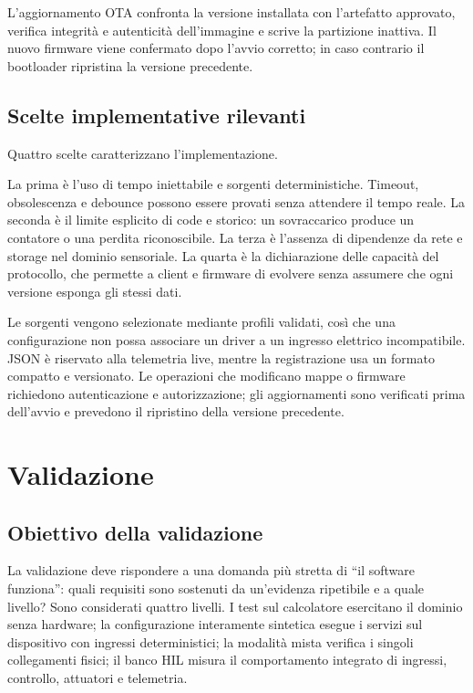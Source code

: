 \documentclass{article}
\begin{document}
L'aggiornamento OTA confronta la versione installata con l'artefatto approvato,
verifica integrità e autenticità dell'immagine e scrive la partizione inattiva.
Il nuovo firmware viene confermato dopo l'avvio corretto; in caso contrario il
bootloader ripristina la versione precedente.

\subsection{Scelte implementative rilevanti}

Quattro scelte caratterizzano l'implementazione.

La prima è l'uso di tempo iniettabile e sorgenti deterministiche. Timeout,
obsolescenza e debounce possono essere provati senza attendere il tempo reale.
La seconda è il limite esplicito di code e storico: un sovraccarico produce un
contatore o una perdita riconoscibile. La terza è l'assenza di dipendenze da
rete e storage nel dominio sensoriale. La quarta è la dichiarazione delle
capacità del protocollo, che permette a client e firmware di evolvere senza
assumere che ogni versione esponga gli stessi dati.

Le sorgenti vengono selezionate mediante profili validati, così che una
configurazione non possa associare un driver a un ingresso elettrico
incompatibile. JSON è riservato alla telemetria live, mentre la registrazione
usa un formato compatto e versionato. Le operazioni che modificano mappe o
firmware richiedono autenticazione e autorizzazione; gli aggiornamenti sono
verificati prima dell'avvio e prevedono il ripristino della versione precedente.

\section{Validazione}
\label{sec:validazione}

\subsection{Obiettivo della validazione}

La validazione deve rispondere a una domanda più stretta di ``il software
funziona'': quali requisiti sono sostenuti da un'evidenza ripetibile e a quale
livello? Sono considerati quattro livelli. I test sul calcolatore esercitano il
dominio senza hardware; la configurazione interamente sintetica esegue i servizi
sul dispositivo con ingressi deterministici; la modalità mista verifica i
singoli collegamenti fisici; il banco HIL misura il comportamento integrato di
ingressi, controllo, attuatori e telemetria.
\end{document}
